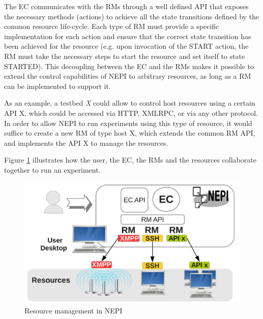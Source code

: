 The EC communicates with the RMs through a well defined API that exposes
the necessary methods (actions) to achieve all the state transitions defined by the
common resource life-cycle. Each type of RM must provide a specific implementation
for each action and ensure that the correct state transition has been achieved
for the resource (e.g. upon invocation of the START action, the RM must take 
the necessary steps to start the resource and set itself to state STARTED).
This decoupling between the EC and the RMs makes it possible to extend the 
control capabilities of NEPI to arbitrary resources, as long as a RM can be 
implemented to support it.

As an example, a testbed \emph{X} could allow to control host resources using a 
certain API X, which could be accessed via HTTP, XMLRPC, or via any other protocol.
In order to allow NEPI to run experiments using this type of resource, it would
suffice to create a new RM of type host X, which extends the common RM API, and
implements the API X to manage the resources.

Figure \ref{fig:intro_resource_management} illustrates how the user, the EC, 
the RMs and the resources collaborate together to run an experiment.

\begin{figure}[h]
  \centering
  \includegraphics[width=\textwidth]{intro_resource_management}
  \caption{Resource management in NEPI}
  \label{fig:intro_resource_management}
\end{figure}
